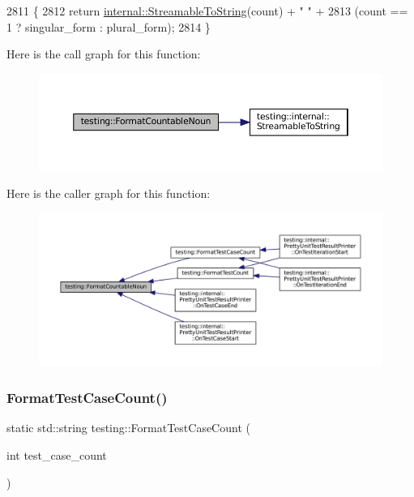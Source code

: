 \begin{DoxyCode}
2811                                                                  \{
2812   \textcolor{keywordflow}{return} \hyperlink{namespacetesting_1_1internal_aad4beed95d0846e6ffc5da0978ef3bb9}{internal::StreamableToString}(count) + \textcolor{stringliteral}{" "} +
2813       (count == 1 ? singular\_form : plural\_form);
2814 \}
\end{DoxyCode}
Here is the call graph for this function\+:
\nopagebreak
\begin{figure}[H]
\begin{center}
\leavevmode
\includegraphics[width=350pt]{namespacetesting_a33e070c3e994cb75f9017fa2a044d536_cgraph}
\end{center}
\end{figure}
Here is the caller graph for this function\+:
\nopagebreak
\begin{figure}[H]
\begin{center}
\leavevmode
\includegraphics[width=350pt]{namespacetesting_a33e070c3e994cb75f9017fa2a044d536_icgraph}
\end{center}
\end{figure}
\mbox{\label{namespacetesting_ab8cabb45f3d8c52d336372c1b62d75c5}} 
\subsubsection{\texorpdfstring{Format\+Test\+Case\+Count()}{FormatTestCaseCount()}}
{\footnotesize\ttfamily static std\+::string testing\+::\+Format\+Test\+Case\+Count (\begin{DoxyParamCaption}\item[{int}]{test\+\_\+case\+\_\+count }\end{DoxyParamCaption})\hspace{0.3cm}{\ttfamily [static]}}



